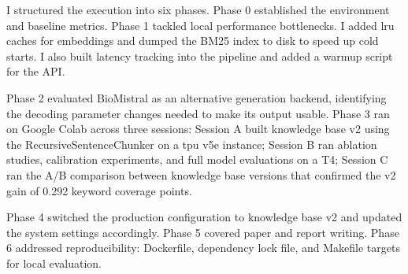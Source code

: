I structured the execution into six phases. Phase 0 established the environment and baseline metrics. Phase 1 tackled local performance bottlenecks. I added \ac{lru} caches for embeddings and dumped the BM25 index to disk to speed up cold starts. I also built latency tracking into the pipeline and added a warmup script for the API.

Phase 2 evaluated BioMistral as an alternative generation backend, identifying the decoding parameter changes needed to make its output usable. Phase 3 ran on Google Colab across three sessions: Session A built knowledge base v2 using the RecursiveSentenceChunker on a \ac{tpu} v5e instance; Session B ran ablation studies, calibration experiments, and full model evaluations on a T4; Session C ran the A/B comparison between knowledge base versions that confirmed the v2 gain of 0.292 keyword coverage points.

Phase 4 switched the production configuration to knowledge base v2 and updated the system settings accordingly. Phase 5 covered paper and report writing. Phase 6 addressed reproducibility: Dockerfile, dependency lock file, and Makefile targets for local evaluation.
